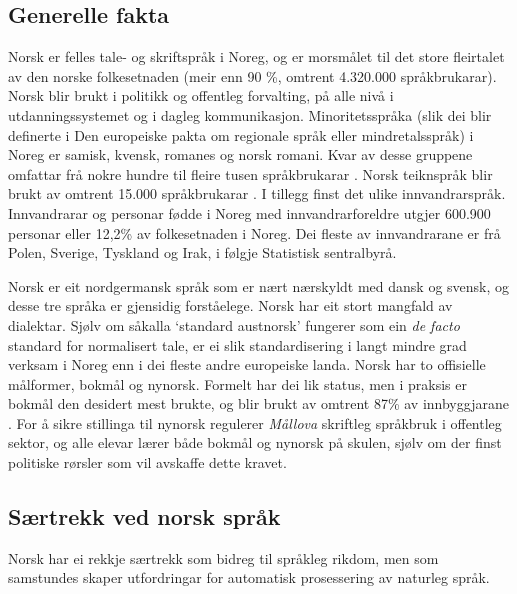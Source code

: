 \clearpage


\begin{multicols}{2}

\subsection{Generelle fakta}

Norsk er felles tale- og skriftspråk i Noreg, og er morsmålet til det store fleirtalet av den norske folkesetnaden (meir enn 90 \%, omtrent 4.320.000 språkbrukarar). 
Norsk blir brukt i politikk og offentleg forvalting, på alle nivå i utdanningssystemet og i dagleg kommunikasjon. 
Minoritetsspråka (slik dei blir definerte i Den europeiske pakta om regionale språk eller mindretalsspråk) i Noreg er samisk, kvensk, romanes og norsk romani. Kvar av desse gruppene omfattar frå nokre hundre til fleire tusen språkbrukarar \cite{stm35:2008}. 
Norsk teiknspråk blir brukt av omtrent 15.000 språkbrukarar \cite{Erl:2007}. 
I tillegg finst det ulike innvandrarspråk. 
Innvandrarar og personar fødde i Noreg med innvandrarforeldre utgjer 600.900 personar eller 12,2\% av folkesetnaden i Noreg. Dei fleste av innvandrarane er frå Polen, Sverige, Tyskland og Irak, i følgje Statistisk sentralbyrå.

Norsk er eit nordgermansk språk som er nært nærskyldt med dansk og svensk, og desse tre språka er gjensidig forståelege. 
Norsk har eit stort mangfald av dialektar. 
Sjølv om såkalla `standard austnorsk' fungerer som ein \textit{de facto} standard for normalisert tale, er ei slik standardisering i langt mindre grad verksam i Noreg enn i dei fleste andre europeiske landa.
Norsk har to offisielle målformer, bokmål og nynorsk. Formelt har dei lik status, men i praksis er bokmål den desidert mest brukte, og blir brukt av omtrent 87\% av innbyggjarane \cite{stm35:2008}. 
For å sikre stillinga til nynorsk regulerer \textit{Mållova} skriftleg språkbruk i offentleg sektor, og alle elevar lærer både bokmål og nynorsk på skulen, sjølv om der finst politiske rørsler som vil avskaffe dette kravet.

\subsection{Særtrekk ved norsk språk}

Norsk har ei rekkje særtrekk som bidreg til språkleg rikdom, men som samstundes skaper utfordringar for automatisk prosessering av naturleg språk.


\end{multicols}
